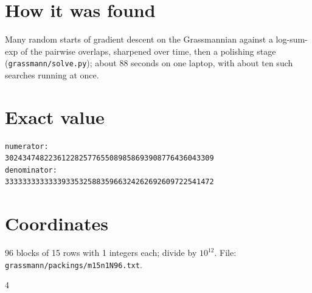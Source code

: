 \documentclass[11pt,a4paper]{article}
\begin{document}
\section{How it was found}
Many random starts of gradient descent on the Grassmannian against a log-sum-exp of the pairwise overlaps, sharpened over time, then a polishing stage (\texttt{grassmann/solve.py}); about 88 seconds on one laptop, with about ten such searches running at once.


\appendix
\section{Exact value}
{\small
\begin{verbatim}
numerator:
302434748223612282577655089858693908776436043309
denominator:
333333333333393353258835966324262692609722541472
\end{verbatim}}

\section{Coordinates}
96 blocks of 15 rows with 1 integers each; divide by $10^{12}$. File: \texttt{grassmann/packings/m15n1N96.txt}.
{\tiny
\begin{multicols}{4}
\end{multicols}}
\end{document}
